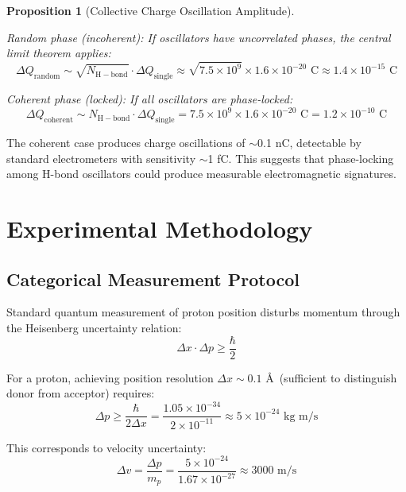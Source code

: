 \documentclass[twocolumn,10pt]{article}
\newtheorem{proposition}[theorem]{Proposition}
\theoremstyle{remark}
\begin{document}
\begin{proposition}[Collective Charge Oscillation Amplitude]
\label{prop:collective_charge}

\textit{Random phase (incoherent):} If oscillators have uncorrelated phases, the central limit theorem applies:
\begin{equation}
\Delta Q_{\mathrm{random}} \sim \sqrt{N_{\mathrm{H-bond}}} \cdot \Delta Q_{\mathrm{single}} \approx \sqrt{7.5 \times 10^9} \times 1.6 \times 10^{-20} \text{ C} \approx 1.4 \times 10^{-15} \text{ C}
\end{equation}

\textit{Coherent phase (locked):} If all oscillators are phase-locked:
\begin{equation}
\Delta Q_{\mathrm{coherent}} \sim N_{\mathrm{H-bond}} \cdot \Delta Q_{\mathrm{single}} = 7.5 \times 10^9 \times 1.6 \times 10^{-20} \text{ C} = 1.2 \times 10^{-10} \text{ C}
\end{equation}
\end{proposition}

The coherent case produces charge oscillations of $\sim$0.1 nC, detectable by standard electrometers with sensitivity $\sim$1 fC. This suggests that phase-locking among H-bond oscillators could produce measurable electromagnetic signatures.

\section{Experimental Methodology}

\subsection{Categorical Measurement Protocol}

Standard quantum measurement of proton position disturbs momentum through the Heisenberg uncertainty relation:
\begin{equation}
\Delta x \cdot \Delta p \geq \frac{\hbar}{2}
\end{equation}

For a proton, achieving position resolution $\Delta x \sim 0.1$ \AA\ (sufficient to distinguish donor from acceptor) requires:
\begin{equation}
\Delta p \geq \frac{\hbar}{2\Delta x} = \frac{1.05 \times 10^{-34}}{2 \times 10^{-11}} \approx 5 \times 10^{-24} \text{ kg m/s}
\end{equation}

This corresponds to velocity uncertainty:
\begin{equation}
\Delta v = \frac{\Delta p}{m_p} = \frac{5 \times 10^{-24}}{1.67 \times 10^{-27}} \approx 3000 \text{ m/s}
\end{equation}
\end{document}
